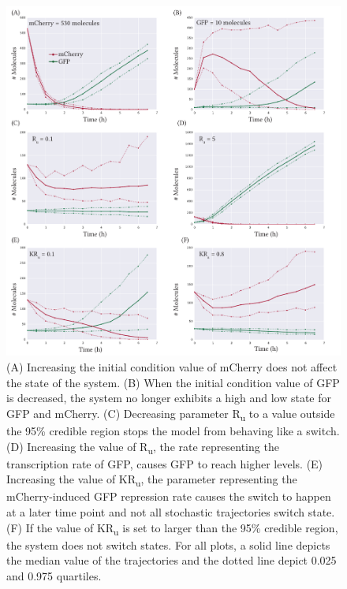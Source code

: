 \begin{figure}[htb]
\centerfloat
	\includegraphics[width=\textwidth]{../../chapters/chapterABCFlow/images/promoter_strengths.pdf}
	\caption[Changing the parameter values affects the behaviour of the switch ]{\label{fig:prom_str} (A) Increasing the initial condition value of mCherry does not affect the state of the system. (B) When the initial condition value of GFP is decreased, the system no longer exhibits a high and low state for GFP and mCherry. (C) Decreasing parameter R\textsubscript{u} to a value outside the 95\% credible region stops the model from behaving like a switch. (D) Increasing the value of R\textsubscript{u}, the rate representing the transcription rate of GFP, causes GFP to reach higher levels. (E) Increasing  the value of KR\textsubscript{u}, the parameter representing the mCherry-induced GFP repression rate causes the switch to happen at a later time point and not all stochastic trajectories switch state. (F) If the value of KR\textsubscript{u} is set to larger than the 95\% credible region, the system does not switch states. For all plots, a solid line depicts the median value of the trajectories and the dotted line depict 0.025 and 0.975 quartiles.}
\end{figure}



